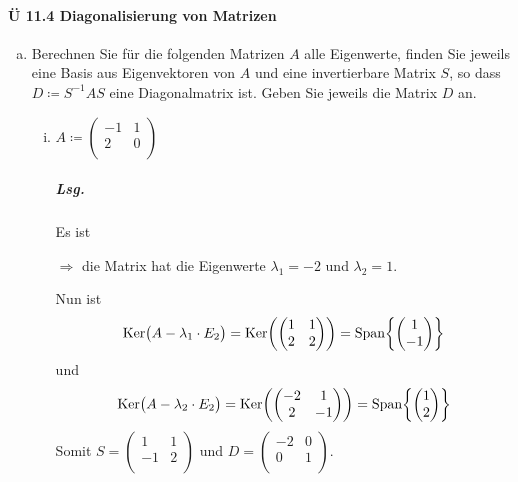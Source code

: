\documentclass{scrreprt}
\begin{document}
\paragraph{Ü 11.4 Diagonalisierung von Matrizen}
\begin{enumerate}[(a)]
\item Berechnen Sie für die folgenden Matrizen $A$ alle Eigenwerte, finden Sie
  jeweils eine Basis aus Eigenvektoren von $A$ und eine invertierbare Matrix $S$,
  so dass $D \coloneq S^{-1}AS$ eine Diagonalmatrix ist.
  Geben Sie jeweils die Matrix $D$ an.
  \begin{enumerate}[(i)]
  \item $A \coloneqq \begin{pmatrix}
      -1 & 1 \\
      2  & 0 \\
    \end{pmatrix}$

    \subparagraph{Lsg.} Es ist
    $\Rightarrow$ die Matrix hat die Eigenwerte $\lambda_1 = -2$ und
    $\lambda_2 = 1$.

    Nun ist
    \[
      \text{Ker}\qty\big(A - \lambda_1 \cdot E_2)
      = \text{Ker}\qty(\begin{pmatrix}
        1 & 1 \\
        2 & 2 \\
      \end{pmatrix})
      = \text{Span}\qty{\begin{pmatrix} 1 \\ -1 \end{pmatrix}}
    \]
    und
    \[
      \text{Ker}\qty\big(A - \lambda_2 \cdot E_2)
      = \text{Ker}\qty(\begin{pmatrix}
        -2 & 1 \\
        2 & -1 \\
      \end{pmatrix})
      = \text{Span}\qty{\begin{pmatrix} 1 \\ 2 \end{pmatrix}}
    \]
    Somit $S = \begin{pmatrix}
      1  & 1 \\
      -1 & 2 \\
    \end{pmatrix}$ und $D = \begin{pmatrix}
      -2 & 0 \\
      0  & 1 \\
    \end{pmatrix}$.


\end{enumerate}
\end{enumerate}
\end{document}
